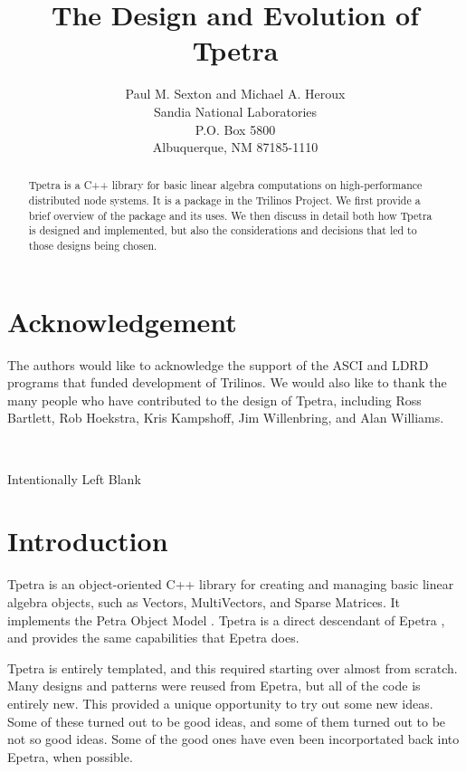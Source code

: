 \documentclass[10pt,relax]{TpetraDesign}
\title{The Design and Evolution of Tpetra}
\author{Paul M. Sexton and Michael A. Heroux \\
       Sandia National Laboratories\\
       P.O. Box 5800\\
       Albuquerque, NM 87185-1110
     }
\date{}
\begin{document}
\maketitle

\begin{abstract}
Tpetra is a C++ library for basic linear algebra computations on high-performance
distributed node systems. It is a package in the Trilinos Project. 
We first provide a brief overview of the package and its uses. We then discuss 
in detail both how Tpetra is designed and implemented, but also the considerations
and decisions that led to those designs being chosen.
\end{abstract}

\clearpage
\section*{Acknowledgement}
The authors would like to acknowledge the support of the ASCI and LDRD programs
that funded development of Trilinos. We would also like to thank the many people
who have contributed to the design of Tpetra, including Ross Bartlett, Rob Hoekstra,
Kris Kampshoff, Jim Willenbring, and Alan Williams.

\clearpage
\tableofcontents

\newpage
\
\vspace{3.5in}
\begin{center}Intentionally Left Blank\end{center}

\newpage

%
\section{Introduction}

Tpetra is an object-oriented C++ library for creating and managing basic linear algebra objects, such as Vectors, MultiVectors, and Sparse Matrices. It implements the Petra Object Model \cite{Petra-Object-Model}. Tpetra is a direct descendant of Epetra \cite{Epetra}, and provides the same capabilities that Epetra does. 

Tpetra is entirely templated, and this required starting over almost from scratch. Many designs and patterns were reused from Epetra, but all of the code is entirely new. This provided a unique opportunity to try out some new ideas. Some of these turned out to be good ideas, and some of them turned out to be not so good ideas. Some of the good ones have even been incorportated back into Epetra, when possible. 
\end{document}
